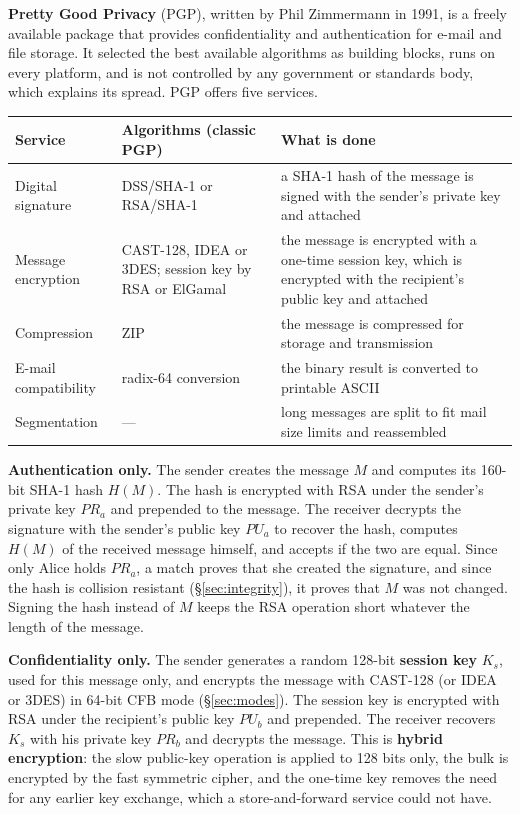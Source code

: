\textbf{Pretty Good Privacy} (PGP), written by Phil Zimmermann in 1991, is a freely available package that provides confidentiality and authentication for e-mail and file storage. It selected the best available algorithms as building blocks, runs on every platform, and is not controlled by any government or standards body, which explains its spread. PGP offers five services.
\begin{center}\small
\begin{tabularx}{\textwidth}{@{}l l >{\raggedright\arraybackslash}X@{}}
\toprule
Service & Algorithms (classic PGP) & What is done\\
\midrule
Digital signature & DSS/SHA-1 or RSA/SHA-1 & a SHA-1 hash of the message is signed with the sender's private key and attached\\
Message encryption & CAST-128, IDEA or 3DES; session key by RSA or ElGamal & the message is encrypted with a one-time session key, which is encrypted with the recipient's public key and attached\\
Compression & ZIP & the message is compressed for storage and transmission\\
E-mail compatibility & radix-64 conversion & the binary result is converted to printable ASCII\\
Segmentation & --- & long messages are split to fit mail size limits and reassembled\\
\bottomrule
\end{tabularx}
\end{center}

\textbf{Authentication only.} The sender creates the message $M$ and computes its 160-bit SHA-1 hash $H(M)$. The hash is encrypted with RSA under the sender's private key $PR_a$ and prepended to the message. The receiver decrypts the signature with the sender's public key $PU_a$ to recover the hash, computes $H(M)$ of the received message himself, and accepts if the two are equal. Since only Alice holds $PR_a$, a match proves that she created the signature, and since the hash is collision resistant (\S\ref{sec:integrity}), it proves that $M$ was not changed. Signing the hash instead of $M$ keeps the RSA operation short whatever the length of the message.

\textbf{Confidentiality only.} The sender generates a random 128-bit \textbf{session key} $K_s$, used for this message only, and encrypts the message with CAST-128 (or IDEA or 3DES) in 64-bit CFB mode (\S\ref{sec:modes}). The session key is encrypted with RSA under the recipient's public key $PU_b$ and prepended. The receiver recovers $K_s$ with his private key $PR_b$ and decrypts the message. This is \textbf{hybrid encryption}: the slow public-key operation is applied to 128 bits only, the bulk is encrypted by the fast symmetric cipher, and the one-time key removes the need for any earlier key exchange, which a store-and-forward service could not have.

